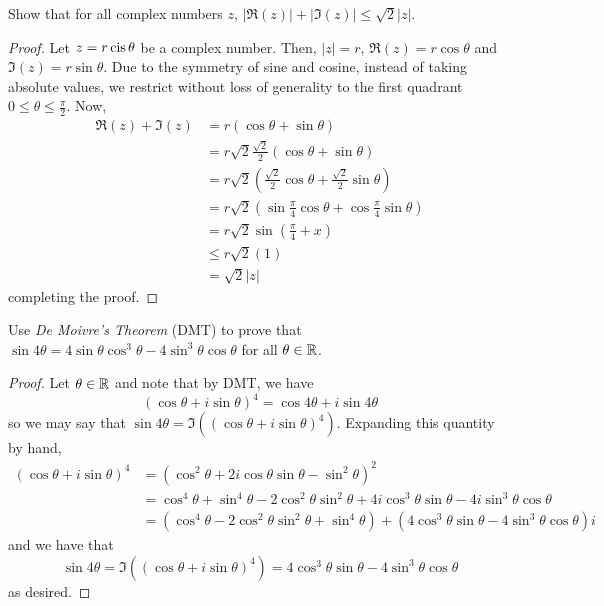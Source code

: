 \question Show that for all complex numbers $z$, $|\Re(z)|+|\Im(z)|\leq\sqrt{2}|z|$.
\begin{proof}
  Let $z = r\operatorname{cis} \theta$ be a complex number.
  Then, $|z| = r$, $\Re(z) = r\cos\theta$ and $\Im(z) = r\sin\theta$.
  Due to the symmetry of sine and cosine, instead of taking absolute values,
  we restrict without loss of generality to the first quadrant $0 \leq \theta \leq \frac\pi2$. Now,
  \begin{align*}
    \Re(z) + \Im(z) & = r(\cos\theta + \sin\theta)                                                          \\
                    & = r\sqrt{2}\frac{\sqrt{2}}{2}(\cos\theta + \sin\theta)                                \\
                    & = r\sqrt{2}\left( \frac{\sqrt{2}}{2}\cos\theta + \frac{\sqrt{2}}{2}\sin\theta \right) \\
                    & = r\sqrt{2}\left( \sin\frac\pi4\cos\theta + \cos\frac\pi4\sin\theta \right)           \\
                    & = r\sqrt{2}\sin\left(\frac\pi4 + x\right)                                             \\
                    & \leq r\sqrt{2}(1)                                                                     \\
                    & = \sqrt{2}|z|
  \end{align*}
  completing the proof.
\end{proof}


\question Use \emph{De Moivre's Theorem} (DMT) to prove that
$\sin 4\theta = 4\sin\theta\cos^3\theta - 4\sin^3\theta\cos\theta$ for all $\theta\in\mathbb{R}$.
\begin{proof}
  Let $\theta \in \mathbb{R}$ and note that by DMT, we have
  \[ (\cos\theta + i\sin\theta)^4 = \cos 4\theta + i\sin 4\theta \]
  so we may say that $\sin 4\theta = \Im((\cos\theta + i\sin\theta)^4)$.
  Expanding this quantity by hand,
  \begin{align*}
    (\cos\theta + i\sin\theta)^4
     & = (\cos^2 \theta + 2i\cos\theta\sin\theta - \sin^2\theta)^2                                                        \\
     & = \cos^4\theta + \sin^4\theta - 2\cos^2\theta\sin^2\theta + 4i\cos^3\theta\sin\theta - 4i\sin^3\theta\cos\theta    \\
     & = (\cos^4\theta - 2\cos^2\theta\sin^2\theta + \sin^4\theta) + (4\cos^3\theta\sin\theta - 4\sin^3\theta\cos\theta)i
  \end{align*}
  and we have that
  \[ \sin 4\theta = \Im((\cos\theta + i\sin\theta)^4) = 4\cos^3\theta\sin\theta - 4\sin^3\theta\cos\theta \]
  as desired.
\end{proof}


